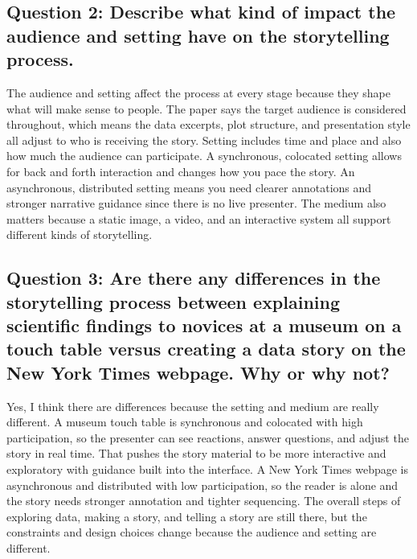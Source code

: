 \documentclass[11pt]{article}
\begin{document}
\subsection*{Question 2: Describe what kind of impact the audience and setting have on the storytelling process.}

The audience and setting affect the process at every stage because they shape what will make sense to people. The paper says the target audience is considered throughout, which means the data excerpts, plot structure, and presentation style all adjust to who is receiving the story. Setting includes time and place and also how much the audience can participate. A synchronous, colocated setting allows for back and forth interaction and changes how you pace the story. An asynchronous, distributed setting means you need clearer annotations and stronger narrative guidance since there is no live presenter. The medium also matters because a static image, a video, and an interactive system all support different kinds of storytelling.

\subsection*{Question 3: Are there any differences in the storytelling process between explaining scientific findings to novices at a museum on a touch table versus creating a data story on the New York Times webpage. Why or why not?}

Yes, I think there are differences because the setting and medium are really different. A museum touch table is synchronous and colocated with high participation, so the presenter can see reactions, answer questions, and adjust the story in real time. That pushes the story material to be more interactive and exploratory with guidance built into the interface. A New York Times webpage is asynchronous and distributed with low participation, so the reader is alone and the story needs stronger annotation and tighter sequencing. The overall steps of exploring data, making a story, and telling a story are still there, but the constraints and design choices change because the audience and setting are different.
\end{document}
